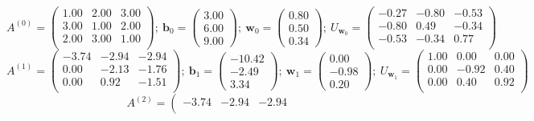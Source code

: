 \begin{example}
  \[A^{(0)}=\left(\begin{array}{ccc}
        1.00 & 2.00 & 3.00 \\
        3.00 & 1.00 & 2.00 \\
        2.00 & 3.00 & 1.00 \\
      \end{array}\right);\
    \mathbf{b}_0=\left(\begin{array}{c} 3.00 \\ 6.00 \\ 9.00   \end{array}\right);\
    \mathbf{w}_0=\left(\begin{array}{c} 0.80 \\ 0.50 \\ 0.34   \end{array}\right);\
    U_{\mathbf{w}_0}=\left(\begin{array}{ccc}
        -0.27 & -0.80 & -0.53 \\
        -0.80 & 0.49  & -0.34 \\
        -0.53 & -0.34 & 0.77  \\
      \end{array}\right)\]
  \[A^{(1)}=\left(\begin{array}{ccc}
        -3.74 & -2.94 & -2.94 \\
        0.00  & -2.13 & -1.76 \\
        0.00  & 0.92  & -1.51 \\
      \end{array}\right);\
    \mathbf{b}_1=\left(\begin{array}{c} -10.42 \\ -2.49 \\ 3.34   \end{array}\right);\
    \mathbf{w}_1=\left(\begin{array}{c} 0.00 \\ -0.98 \\ 0.20   \end{array}\right);\
    U_{\mathbf{w}_1}=\left(\begin{array}{ccc}
        1.00 & 0.00  & 0.00 \\
        0.00 & -0.92 & 0.40 \\
        0.00 & 0.40  & 0.92 \\
      \end{array}\right)\]
  \[A^{(2)}=\left(\begin{array}{ccc}
        -3.74 & -2.94 & -2.94 \\

\end{array}\]
\end{example}
